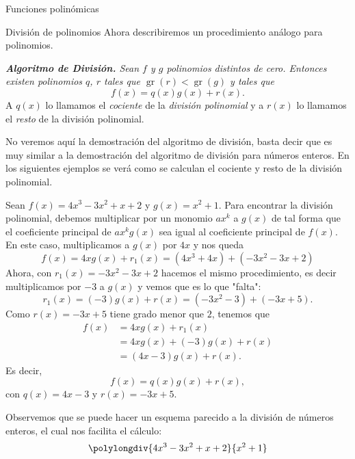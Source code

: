 \begin{chapter}{Funciones polinómicas}
\begin{section}{División de polinomios}
    Ahora describiremos un procedimiento análogo para polinomios.

    \textit{\textbf{Algoritmo de División.} Sean $f$ y $g$ polinomios distintos de cero. Entonces existen polinomios $q$, $r$ tales que $\operatorname{gr}(r) < \operatorname{gr}(g)$ y tales que}
    \begin{equation*}
        f (x) = q (x) g (x) + r (x).
    \end{equation*}
    A $q(x)$ lo llamamos el \textit{cociente} de la \textit{división polinomial} y  a $r(x)$ lo llamamos el \textit{resto}  de la división polinomial.

    No veremos aquí la demostración del algoritmo de división, basta decir que es muy similar a  la demostración del algoritmo de división para números enteros. En los siguientes ejemplos se verá como se calculan el cociente y resto de la división polinomial.

    \begin{ejemplo*} Sean $f(x) = 4x^3 - 3x^2 + x + 2$ y $g(x) = x^2 + 1$. Para encontrar la división polinomial, debemos multiplicar por un monomio $ax^k$ a $g(x)$ de tal forma que el coeficiente principal de  $ax^kg(x)$ sea igual al coeficiente principal de $f(x)$. En este caso, multiplicamos a $g(x)$ por $4x$ y nos queda
        \begin{equation*}
            f(x) = 4xg(x) + r_1(x) = (4x^3 +4x)+(-3x^2-3x +2)
        \end{equation*}
        Ahora,  con $r_1(x)=-3x^2-3x +2$ hacemos el mismo procedimiento,  es decir multiplicamos por $-3$  a $g(x)$ y vemos que es lo que "falta":
        \begin{equation*}
            r_1(x) = (-3)g(x) +r(x) = (-3x^2 -3) + (-3x+5).
        \end{equation*}
        Como $r(x) = -3x+5$ tiene grado menor que $2$, tenemos que
        \begin{align*}
            f(x) & = 4xg(x) + r_1(x) \\ &=4xg(x) + (-3)g(x) +r(x)\\& = (4x-3)g(x)+r(x).
        \end{align*}
        Es decir,
        \begin{equation*}
            f(x) = q(x)g(x)+r(x),
        \end{equation*}
        con $q(x) =4x-3$ y $r(x) = -3x+5$.

        Observemos que se puede hacer un esquema parecido a  la división de números enteros, el cual nos facilita el cálculo:
        \begin{equation*}
            \polylongdiv{4x^3 - 3x^2 + x + 2}{ x^2 + 1}
        \end{equation*}
    \end{ejemplo*}


\end{section}
\end{chapter}
